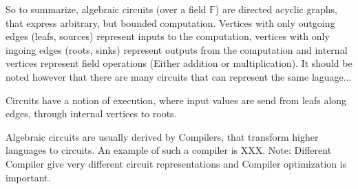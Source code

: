 So to summarize, algebraic circuits (over a field $\mathbb{F}$) are directed acyclic graphs, that express arbitrary, but bounded computation. Vertices with only outgoing edges (leafs, sources) represent inputs to the computation, vertices with only ingoing edges (roots, sinks) represent outputs from the computation and internal vertices represent field operations (Either addition or multiplication). It should be noted however that there are many circuits that can represent the same laguage...

Circuits have a notion of execution, where input values are send from leafs along edges, through internal vertices to roots.

\begin{remark}
Algebraic circuits are usually derived by  Compilers, that transform  higher languages to circuits. An example of such a compiler is XXX. Note: Different Compiler give very different circuit representations and Compiler optimization is important.
\end{remark}


